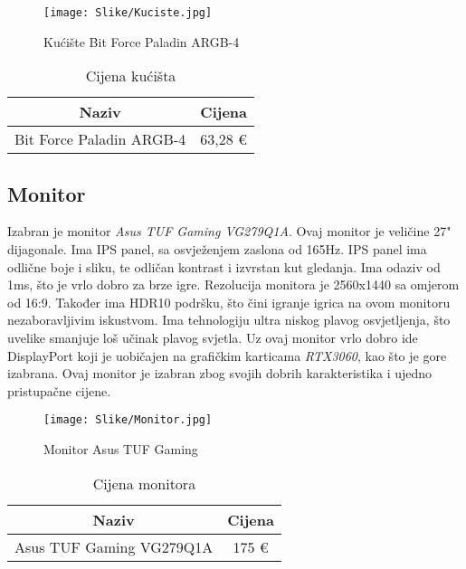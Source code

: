 \documentclass[14pt]{article}
\begin{document}
    \begin{figure}[H]
        \centering
        \texttt{[image: Slike/Kuciste.jpg]}
        \caption{Kućište Bit Force Paladin ARGB-4}
        \label{fig:Kuciste}
    \end{figure}

    \begin{table}[H]
        \centering
        \begin{tabular}{|c|c|}
            \hline
            Naziv & Cijena \\
            \hline
            Bit Force Paladin ARGB-4 & 63,28 € \\
            \hline
        \end{tabular}
        \caption{Cijena kućišta}
        \label{tab:Kuciste}
    \end{table}

    \clearpage
    \subsection{Monitor}
    Izabran je monitor \textit{Asus TUF Gaming VG279Q1A}. Ovaj monitor je veličine 27" dijagonale. Ima IPS panel, sa osvježenjem zaslona od 165Hz. IPS panel ima odlične boje i sliku, te odličan kontrast i izvrstan kut gledanja. Ima odaziv od 1ms, što je vrlo dobro za brze igre. Rezolucija monitora je 2560x1440 sa omjerom od 16:9. Također ima HDR10 podršku, što čini igranje igrica na ovom monitoru nezaboravljivim iskustvom. Ima tehnologiju ultra niskog plavog osvjetljenja, što uvelike smanjuje loš učinak plavog svjetla. Uz ovaj monitor vrlo dobro ide DisplayPort koji je uobičajen na grafičkim karticama \textit{RTX3060}, kao što je gore izabrana. Ovaj monitor je izabran zbog svojih dobrih karakteristika i ujedno pristupačne cijene.

    \begin{figure}[H]
        \centering
        \texttt{[image: Slike/Monitor.jpg]}
        \caption{Monitor Asus TUF Gaming}
        \label{fig:Monitor}
    \end{figure}

    \begin{table}[H]
        \centering
        \begin{tabular}{|c|c|}
            \hline
            Naziv & Cijena \\
            \hline
            Asus TUF Gaming VG279Q1A & 175 € \\
            \hline
        \end{tabular}
        \caption{Cijena monitora}
        \label{tab:Monitor}
    \end{table}
\end{document}

